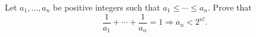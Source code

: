 Let $a_1, \ldots, a_n$ be positive integers such that $a_1 \leq \cdots \leq a_n$. Prove that
\[ \frac{1}{a_1} + \cdots + \frac{1}{a_n} = 1 \Rightarrow a_n < 2^{n!}. \]
